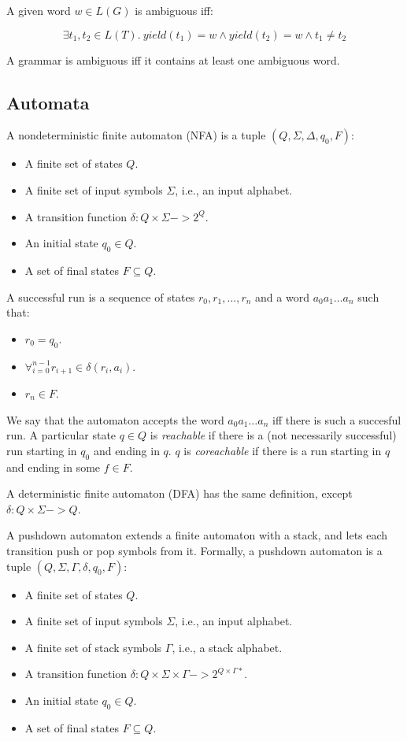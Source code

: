\documentclass[sigplan]{acmart}\settopmatter{printfolios=true,printccs=false,printacmref=false}
\newcommand{\yield}{\mathit{yield}} %
\begin{document}
A given word $w \in L(G)$ is ambiguous iff:

$$\exists t_1, t_2 \in L(T).\ \yield(t_1) = w \land \yield(t_2) = w \land t_1 \neq t_2$$

\noindent A grammar is ambiguous iff it contains at least one ambiguous word.

\subsection{Automata}

A nondeterministic finite automaton (NFA) is a tuple $(Q, \Sigma, \Delta, q_0, F)$:

\begin{itemize}
\item A finite set of states $Q$.
\item A finite set of input symbols $\Sigma$, i.e., an input alphabet.
\item A transition function $\delta: Q \times \Sigma -> 2^Q$.
\item An initial state $q_0 \in Q$.
\item A set of final states $F \subseteq Q$.
\end{itemize}

\noindent A successful run is a sequence of states $r_0, r_1, \ldots, r_n$ and a word $a_0a_1\ldots a_n$ such that:

\begin{itemize}
\item $r_0 = q_0$.
\item $\forall_{i = 0}^{n-1} r_{i+1} \in \delta(r_i, a_i)$.
\item $r_n \in F$.
\end{itemize}

\noindent We say that the automaton accepts the word $a_0a_1\ldots a_n$ iff there is such a succesful run. A particular state $q \in Q$ is \emph{reachable} if there is a (not necessarily successful) run starting in $q_0$ and ending in $q$. $q$ is \emph{coreachable} if there is a run starting in $q$ and ending in some $f \in F$.

A deterministic finite automaton (DFA) has the same definition, except $\delta : Q \times \Sigma -> Q$.

A pushdown automaton extends a finite automaton with a stack, and lets each transition push or pop symbols from it. Formally, a pushdown automaton is a tuple $(Q, \Sigma, \Gamma, \delta, q_0, F)$:

\begin{itemize}
\item A finite set of states $Q$.
\item A finite set of input symbols $\Sigma$, i.e., an input alphabet.
\item A finite set of stack symbols $\Gamma$, i.e., a stack alphabet.
\item A transition function $\delta: Q \times \Sigma \times \Gamma -> 2^{Q \times \Gamma*}$.
\item An initial state $q_0 \in Q$.
\item A set of final states $F \subseteq Q$.
\end{itemize}
\end{document}
